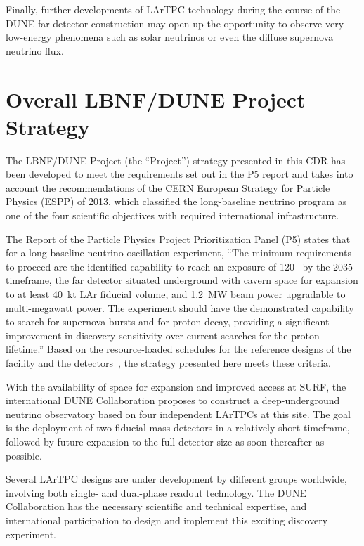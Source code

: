 Finally, further developments of LArTPC  
technology during the course of the DUNE far detector construction may open up the opportunity
to observe very low-energy phenomena such as solar neutrinos or even the diffuse supernova neutrino flux.


\section{Overall LBNF/DUNE Project Strategy} 

The LBNF/DUNE Project (the ``Project'') strategy presented in this CDR has been developed to meet the requirements 
set out in the P5 report and 
takes into account the recommendations of the CERN European Strategy for Particle 
Physics (ESPP) of 2013, which classified the long-baseline neutrino program as 
one of the four scientific objectives with required international infrastructure.

The Report of the Particle Physics Project Prioritization Panel (P5) 
states that for a long-baseline neutrino oscillation experiment, ``The 
minimum requirements to proceed are the identified capability to reach an exposure 
of \num{120}~\ktMWyr{} by the 2035 timeframe, the far detector situated underground 
with cavern space for expansion to at least 40~kt LAr fiducial volume, and 1.2~MW 
beam power upgradable to multi-megawatt power. The experiment should have the demonstrated 
capability to search for supernova bursts and for proton decay, providing a significant 
improvement in discovery sensitivity over current searches for the proton lifetime.'' 
Based on the resource-loaded schedules for the reference designs of the facility 
and the detectors~\cite{lbnf-cf-pdr, cryo-design-rpt, design-doc-dune-det}, 
the strategy presented here meets these criteria. 

With the availability of space for expansion and improved access at SURF, 
the international DUNE Collaboration proposes to construct a deep-underground neutrino observatory based on four independent  LArTPCs at this site.   
The goal is the deployment of two  fiducial mass detectors in a relatively short timeframe, followed by future expansion to the full detector size as soon thereafter as possible. 

Several LArTPC designs are under development by different groups worldwide, involving both single- and dual-phase readout technology.
The DUNE Collaboration has the necessary scientific and technical expertise,  
and international participation  to design and implement this exciting discovery experiment. 

